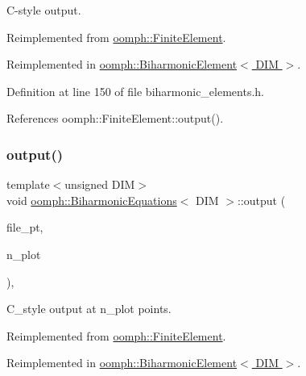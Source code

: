 C-\/style output. 



Reimplemented from \hyperlink{classoomph_1_1FiniteElement_a72cddd09f8ddbee1a20a1ff404c6943e}{oomph\+::\+Finite\+Element}.



Reimplemented in \hyperlink{classoomph_1_1BiharmonicElement_a405526be1bc18d1b758410767c1d1cae}{oomph\+::\+Biharmonic\+Element$<$ D\+I\+M $>$}.



Definition at line 150 of file biharmonic\+\_\+elements.\+h.



References oomph\+::\+Finite\+Element\+::output().

\mbox{\label{classoomph_1_1BiharmonicEquations_af0fa36f6c36da7cfaf8f28f3609a0c6c}} 
\subsubsection{\texorpdfstring{output()}{output()}\hspace{0.1cm}{\footnotesize\ttfamily [4/4]}}
{\footnotesize\ttfamily template$<$unsigned D\+IM$>$ \\
void \hyperlink{classoomph_1_1BiharmonicEquations}{oomph\+::\+Biharmonic\+Equations}$<$ D\+IM $>$\+::output (\begin{DoxyParamCaption}\item[{F\+I\+LE $\ast$}]{file\+\_\+pt,  }\item[{const unsigned \&}]{n\+\_\+plot }\end{DoxyParamCaption})\hspace{0.3cm}{\ttfamily [inline]}, {\ttfamily [virtual]}}



C\+\_\+style output at n\+\_\+plot points. 



Reimplemented from \hyperlink{classoomph_1_1FiniteElement_adfaee690bb0608f03320eeb9d110d48c}{oomph\+::\+Finite\+Element}.



Reimplemented in \hyperlink{classoomph_1_1BiharmonicElement_a6466cb310679bf54811011f086ffb957}{oomph\+::\+Biharmonic\+Element$<$ D\+I\+M $>$}.



